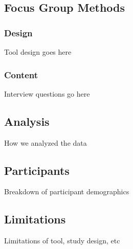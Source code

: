 \subsection{Focus Group Methods}


\subsubsection{Design}
Tool design goes here

\subsubsection{Content}
Interview questions go here

\subsection{Analysis} 
How we analyzed the data

\subsection{Participants} 
Breakdown of participant demographics

\subsection{Limitations}
Limitations of tool, study design, etc

